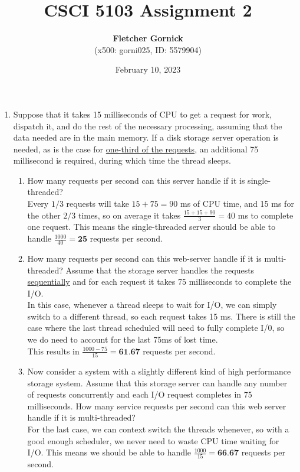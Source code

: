\documentclass[11pt]{article}
\title{\vspace{-1.0cm}\textbf{CSCI 5103 Assignment 2}}
\date{February 10, 2023}
\author{\textbf{Fletcher Gornick}\\(x500: gorni025, ID: 5579904)}
\newcommand{\n}{\vspace{0.5cm}}
\begin{document}
\maketitle

\begin{enumerate}
  \item Suppose that it takes 15 milliseconds of CPU to get a request for work, dispatch it, and do the rest of the necessary processing, assuming that the data needed are in the main memory.  If a disk storage server operation is needed, as is the case for \ul{one-third of the requests}, an additional 75 millisecond is required, during which time the thread sleeps.
    \begin{enumerate}
      \item How many requests per second can this server handle if it is single-threaded? \n\\
        Every \(1/3\) requests will take \(15+75=90\) ms of CPU time, and 15 ms for the other \(2/3\) times, so on average it takes \(\frac{15 + 15 + 90}{3} = 40\) ms to complete one request.  This means the single-threaded server should be able to handle \(\frac{1000}{40} = \textbf{25}\) requests per second. \n

      \item How many requests per second can this web-server handle if it is multi-threaded?  Assume that the storage server handles the requests \ul{sequentially} and for each request it takes 75 milliseconds to complete the I/O. \n\\
        In this case, whenever a thread sleeps to wait for I/O, we can simply switch to a different thread, so each request takes 15 ms.  There is still the case where the last thread scheduled will need to fully complete I/0, so we do need to account for the last 75ms of lost time. \\
        This results in \(\frac{1000 - 75}{15} = \textbf{61.67}\) requests per second.\n

      \item Now consider a system with a slightly different kind of high performance storage system.  Assume that this storage server can handle any number of requests concurrently and each I/O request completes in 75 milliseconds.  How many service requests per second can this web server handle if it is multi-threaded? \n\\
        For the last case, we can context switch the threads whenever, so with a good enough scheduler, we never need to waste CPU time waiting for I/O.  This means we should be able to handle \(\frac{1000}{15} = \textbf{66.67}\) requests per second. \n
    \end{enumerate}
    \newpage


\end{enumerate}
\end{document}
